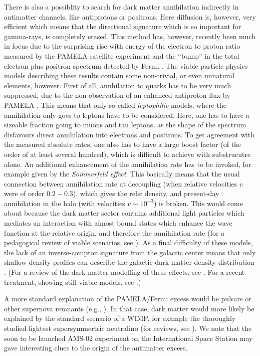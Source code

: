 \documentclass[10pt,aps,pra,reprint,amsmath,amsfonts,amssymb,showpacs]{revtex4-1}
\begin{document}
There is also a possiblity to search for dark matter annihilation
indirectly in antimatter channels, like antiprotons or positrons. Here
diffusion is, however, very efficient which means that the directional
signature which is so important for gamma-rays, is completely
erased. This method has, however, recently been much in focus due to
the surprising rise with energy of the electron to proton ratio
measured by the PAMELA satellite experiment \cite{Adriani:2008zr} and
the ``bump'' in the total electron plus positron spectrum detected by
Fermi \cite{Abdo:2009zk}. The viable particle physics models
describing these results contain some non-trivial, or even unnatural
elements, however. First of all, annhilation to quarks has to be very
much suppressed, due to the non-observation of an enhanced antiproton
flux by PAMELA \cite{Adriani:2010rc}. This means that only so-called
{\em leptophilic} models, where the annihilation only goes to leptons
have to be considered. Here, one has to have a sizeable fraction going
to muons and tau leptons, as the shape of the spectrum disfavours
direct annihilation into electrons and positrons. To get agreement
with the measured absolute rates, one also has to have a large boost
factor (of the order of at least several hundred), which is difficult
to achieve with substrucutre alone. An additional enhancement of the
annihilation rate has to be invoked, for example given by the {\em
  Sommerfeld effect}. This basically means that the usual connection
between annihilation rate at decoupling (when relative velocities $v$
were of order $0.2 - 0.3$), which gives the relic density, and
present-day annihilation in the halo (with velocities $v\sim 10^{-3}$)
is broken. This would come about because the dark matter sector
contains additional light particles which mediates an interaction with
almost bound states which enhance the wave function at the relative
origin, and therefore the annihilation rate (for a pedagogical review
of viable scenarios, see \cite{ArkaniHamed:2008qn}). As a final
difficulty of these models, the lack of an inverse-compton signature
from the galactic center means that only shallow density profiles can
describe the galactic dark matter density distribution
\cite{Bertone:2008xr,Cirelli:2008pk,Bergstrom:2008ag}. (For a review
of the dark matter modelling of these effects, see
\cite{Bergstrom:2009ib}. For a recent treatment, showing still viable
models, see \cite{Finkbeiner:2010sm}.)

A more standard explanation of the PAMELA/Fermi excess would be
pulsars or other supernova remnants (e.g.,
\cite{Hooper:2008kg,Ahlers:2009ae}). In that case, dark matter would
more likely be explained by the standard scenario of a WIMP, for
example the thoroughly studied lightest supersymmertric neutralino
(for reviews, see
\cite{Jungman:1995df,Bergstrom:2000pn,Bertone:2004pz}). We note that
the soon to be launched AMS-02 experiment on the International Space
Station \cite{ams02} may gave interesting clues to the origin of the
antimatter excess.
\end{document}
